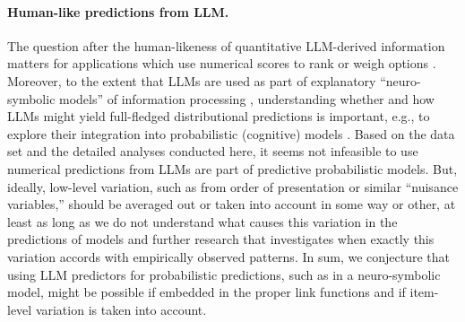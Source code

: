 \documentclass[fleqn]{article}
\begin{document}
\paragraph{Human-like predictions from LLM.}
The question after the human-likeness of quantitative LLM-derived information matters for applications which use numerical scores to rank or weigh options \citep[e.g.,][]{ParkOBrien2023:Generative-Agen,ZhangLehman2023:OMNI:-Open-ende}.
Moreover, to the extent that LLMs are used as part of explanatory ``neuro-symbolic models'' of information processing \citep{GarcezLamb2020:Neurosymbolic-A}, understanding whether and how LLMs might yield full-fledged distributional predictions is important, e.g., to explore their integration into probabilistic (cognitive) models \citep[c.f.,][]{Frank2023:Large-language-}.
Based on the data set and the detailed analyses conducted here, it seems not infeasible to use numerical predictions from LLMs are part of predictive probabilistic models.
But, ideally, low-level variation, such as from order of presentation or similar ``nuisance variables,'' should be averaged out or taken into account in some way or other, at least as long as we do not understand what causes this variation in the predictions of models and further research that investigates when exactly this variation accords with empirically observed patterns.
In sum, we conjecture that using LLM predictors for probabilistic predictions, such as in a neuro-symbolic model, might be possible if embedded in the proper link functions and if item-level variation is taken into account.
\end{document}
